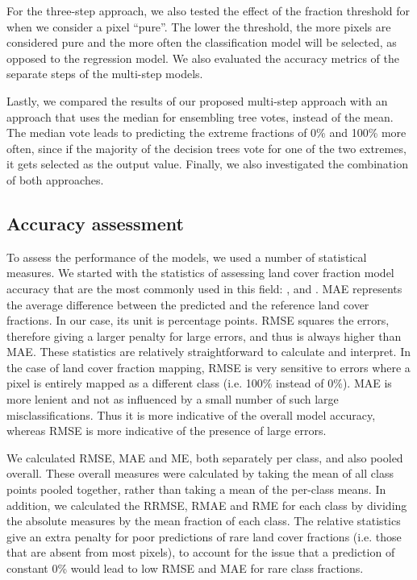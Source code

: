 \documentclass[review,authoryear,3p]{elsarticle}
\begin{document}
For the three-step approach, we also tested the effect of the fraction threshold for when we consider a pixel ``pure''.
The lower the threshold, the more pixels are considered pure and the more often the classification model will be selected, as opposed to the regression model.
We also evaluated the accuracy metrics of the separate steps of the multi-step models.

Lastly, we compared the results of our proposed multi-step approach with an approach that uses the median for ensembling tree votes, instead of the mean.
The median vote leads to predicting the extreme fractions of 0\% and 100\% more often, since if the majority of the decision trees vote for one of the two extremes, it gets selected as the output value.
Finally, we also investigated the combination of both approaches.

\subsection{Accuracy assessment}

To assess the performance of the models, we used a number of statistical measures.
We started with the statistics of assessing land cover fraction model accuracy that are the most commonly used in this field: ,  and .
\gls{MAE} represents the average difference between the predicted and the reference land cover fractions.
In our case, its unit is percentage points.
\gls{RMSE} squares the errors, therefore giving a larger penalty for large errors, and thus is always higher than \gls{MAE}.
These statistics are relatively straightforward to calculate and interpret.
In the case of land cover fraction mapping, \gls{RMSE} is very sensitive to errors where a pixel is entirely mapped as a different class (i.e. 100\% instead of 0\%).
\gls{MAE} is more lenient and not as influenced by a small number of such large misclassifications.
Thus it is more indicative of the overall model accuracy, whereas \gls{RMSE} is more indicative of the presence of large errors.

We calculated \gls{RMSE}, \ac{MAE} and \ac{ME}, both separately per class, and also pooled overall.
These overall measures were calculated by taking the mean of all class points pooled together, rather than taking a mean of the per-class means.
In addition, we calculated the \gls{RRMSE}, \gls{RMAE} and \gls{RME} for each class by dividing the absolute measures by the mean fraction of each class.
The relative statistics give an extra penalty for poor predictions of rare land cover fractions (i.e. those that are absent from most pixels), to account for the issue that a prediction of constant 0\% would lead to low \gls{RMSE} and \gls{MAE} for rare class fractions.
\end{document}
